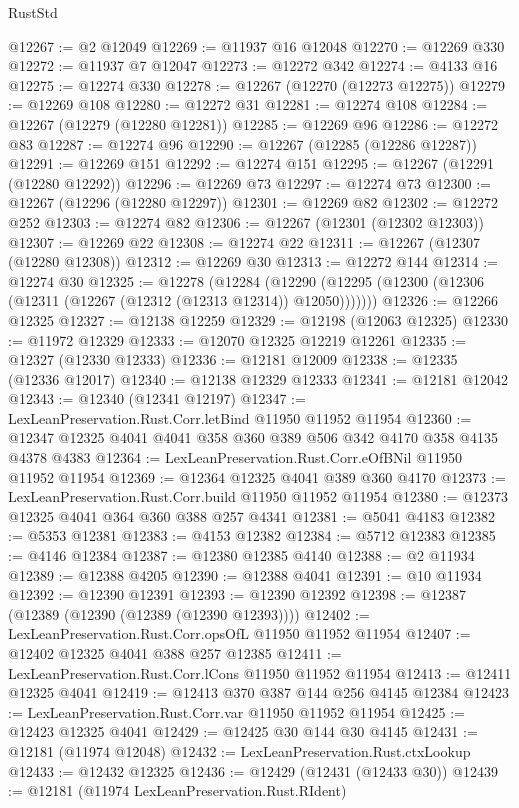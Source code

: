 \begin{lexlean}{RustStd}
\begin{coremodule}
@12267 := @2 @12049
@12269 := @11937 @16 @12048
@12270 := @12269 @330
@12272 := @11937 @7 @12047
@12273 := @12272 @342
@12274 := @4133 @16
@12275 := @12274 @330
@12278 := @12267 (@12270 (@12273 @12275))
@12279 := @12269 @108
@12280 := @12272 @31
@12281 := @12274 @108
@12284 := @12267 (@12279 (@12280 @12281))
@12285 := @12269 @96
@12286 := @12272 @83
@12287 := @12274 @96
@12290 := @12267 (@12285 (@12286 @12287))
@12291 := @12269 @151
@12292 := @12274 @151
@12295 := @12267 (@12291 (@12280 @12292))
@12296 := @12269 @73
@12297 := @12274 @73
@12300 := @12267 (@12296 (@12280 @12297))
@12301 := @12269 @82
@12302 := @12272 @252
@12303 := @12274 @82
@12306 := @12267 (@12301 (@12302 @12303))
@12307 := @12269 @22
@12308 := @12274 @22
@12311 := @12267 (@12307 (@12280 @12308))
@12312 := @12269 @30
@12313 := @12272 @144
@12314 := @12274 @30
@12325 := @12278
    (@12284 (@12290 (@12295 (@12300 (@12306 (@12311 (@12267 (@12312 (@12313 @12314)) @12050)))))))
@12326 := @12266 @12325
@12327 := @12138 @12259
@12329 := @12198 (@12063 @12325)
@12330 := @11972 @12329
@12333 := @12070 @12325 @12219 @12261
@12335 := @12327 (@12330 @12333)
@12336 := @12181 @12009
@12338 := @12335 (@12336 @12017)
@12340 := @12138 @12329 @12333
@12341 := @12181 @12042
@12343 := @12340 (@12341 @12197)
@12347 := LexLeanPreservation.Rust.Corr.letBind @11950 @11952 @11954
@12360 := @12347 @12325 @4041 @4041 @358 @360 @389 @506 @342 @4170 @358 @4135 @4378 @4383
@12364 := LexLeanPreservation.Rust.Corr.eOfBNil @11950 @11952 @11954
@12369 := @12364 @12325 @4041 @389 @360 @4170
@12373 := LexLeanPreservation.Rust.Corr.build @11950 @11952 @11954
@12380 := @12373 @12325 @4041 @364 @360 @388 @257 @4341
@12381 := @5041 @4183
@12382 := @5353 @12381
@12383 := @4153 @12382
@12384 := @5712 @12383
@12385 := @4146 @12384
@12387 := @12380 @12385 @4140
@12388 := @2 @11934
@12389 := @12388 @4205
@12390 := @12388 @4041
@12391 := @10 @11934
@12392 := @12390 @12391
@12393 := @12390 @12392
@12398 := @12387 (@12389 (@12390 (@12389 (@12390 @12393))))
@12402 := LexLeanPreservation.Rust.Corr.opsOfL @11950 @11952 @11954
@12407 := @12402 @12325 @4041 @388 @257 @12385
@12411 := LexLeanPreservation.Rust.Corr.lCons @11950 @11952 @11954
@12413 := @12411 @12325 @4041
@12419 := @12413 @370 @387 @144 @256 @4145 @12384
@12423 := LexLeanPreservation.Rust.Corr.var @11950 @11952 @11954
@12425 := @12423 @12325 @4041
@12429 := @12425 @30 @144 @30 @4145
@12431 := @12181 (@11974 @12048)
@12432 := LexLeanPreservation.Rust.ctxLookup
@12433 := @12432 @12325
@12436 := @12429 (@12431 (@12433 @30))
@12439 := @12181 (@11974 LexLeanPreservation.Rust.RIdent)

\end{coremodule}
\end{lexlean}
